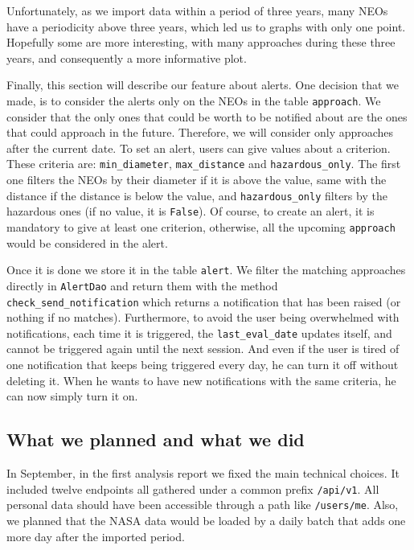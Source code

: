 Unfortunately, as we import data within a period of three years, many NEOs have a periodicity above three years, which led us to graphs with only one point. Hopefully some are more interesting, with many approaches during these three years, and consequently a more informative plot.

\bigskip

Finally, this section will describe our feature about alerts. One decision that we made, is to consider the alerts only on the NEOs in the table \texttt{approach}. We consider that the only ones that could be worth to be notified about are the ones that could approach in the future. Therefore, we will consider only approaches after the current date. To set an alert, users can give values about a criterion. These criteria are: \texttt{min\_diameter}, \texttt{max\_distance} and \texttt{hazardous\_only}. The first one filters the NEOs by their diameter if it is above the value, same with the distance if the distance is below the value, and \texttt{hazardous\_only} filters by the hazardous ones (if no value, it is \texttt{False}). Of course, to create an alert, it is mandatory to give at least one criterion, otherwise, all the upcoming \texttt{approach} would be considered in the alert.

Once it is done we store it in the table \texttt{alert}. We filter the matching approaches directly in \texttt{AlertDao} and return them with the method \texttt{check\_send\_notification} which returns a notification that has been raised (or nothing if no matches). Furthermore, to avoid the user being overwhelmed with notifications, each time it is triggered, the \texttt{last\_eval\_date} updates itself, and cannot be triggered again until the next session. And even if the user is tired of one notification that keeps being triggered every day, he can turn it off without deleting it. When he wants to have new notifications with the same criteria, he can now simply turn it on.


\subsection{What we planned and what we did}

In September, in the first analysis report we fixed the main technical choices. It included twelve endpoints all gathered under a common prefix \texttt{/api/v1}. All personal data should have been accessible through a path like \texttt{/users/me}. Also, we planned that the NASA data would be loaded by a daily batch that adds one more day after the imported period.

